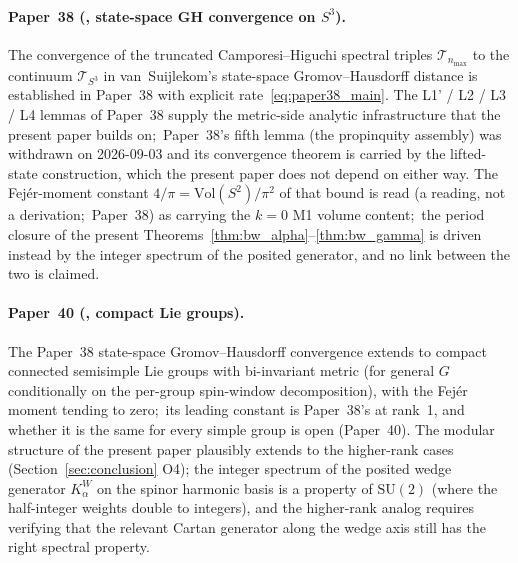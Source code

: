 \documentclass[11pt,a4paper]{article}
\theoremstyle{plain}
\theoremstyle{definition}
\newcommand{\nmax}{n_{\max}}
\newcommand{\sthree}{S^{3}}
\newcommand{\Tcal}{\mathcal{T}}
\newcommand{\SU}{\mathrm{SU}}
\newcommand{\Vol}{\mathrm{Vol}}
\begin{document}
\paragraph{Paper~38 (\cite{paper38}, state-space GH convergence on
$\sthree$).}
The convergence of the truncated Camporesi--Higuchi spectral triples
$\Tcal_{\nmax}$ to the continuum $\Tcal_{\sthree}$ in van~Suijlekom's
state-space Gromov--Hausdorff distance is established in Paper~38 with
explicit rate~\eqref{eq:paper38_main}. The L1' / L2 / L3 / L4
lemmas of Paper~38 supply the metric-side analytic infrastructure
that the present paper builds on;\ Paper~38's fifth lemma (the
propinquity assembly) was withdrawn on 2026-09-03 and its convergence
theorem is carried by the lifted-state construction, which the present
paper does not depend on either way. The Fej\'er-moment constant
$4/\pi = \Vol(S^2)/\pi^2$ of that bound is read (a reading, not a derivation;\
Paper~38) as carrying the $k = 0$ M1 volume content;\ the
period closure of the present
Theorems~\ref{thm:bw_alpha}--\ref{thm:bw_gamma} is driven instead by
the integer spectrum of the posited generator, and no link between the
two is claimed.

\paragraph{Paper~40 (\cite{paper40_unified}, compact Lie groups).}
The Paper~38 state-space Gromov--Hausdorff convergence extends to compact
connected semisimple Lie groups with bi-invariant metric (for general $G$
conditionally on the per-group spin-window decomposition), with the
Fej\'er moment tending to zero;\ its leading constant is Paper~38's at
rank~1, and whether it is the same for every simple group is open
(Paper~40). The
modular structure of the present paper plausibly extends to the
higher-rank cases (Section~\ref{sec:conclusion} O4); the integer
spectrum of the posited wedge generator $K_\alpha^W$ on the spinor
harmonic basis is a property of $\SU(2)$ (where the half-integer
weights double to integers), and the higher-rank analog requires
verifying that the relevant Cartan generator along the wedge axis
still has the right spectral property.
\end{document}
